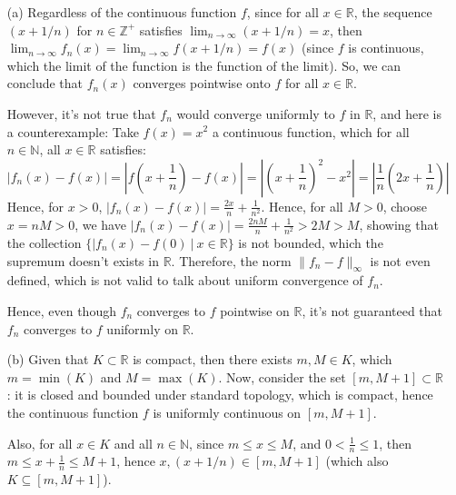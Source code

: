 \documentclass{article}
\begin{document}
\begin{itemize}
    \item[(a)] Regardless of the continuous function $f$,
    since for all $x\in\mathbb{R}$, the sequence $(x+1/n)$ for $n\in\mathbb{Z}^+$ satisfies $\lim_{n\rightarrow\infty}(x+1/n)=x$,
    then $\lim_{n\rightarrow\infty}f_n(x)=\lim_{n\rightarrow\infty} f(x+1/n) = f(x)$ (since $f$ is continuous, which the limit of the function is the function of the limit).
    So, we can conclude that $f_n(x)$ converges pointwise onto $f$ for all $x\in\mathbb{R}$.

    However, it's not true that $f_n$ would converge uniformly to $f$ in $\mathbb{R}$, and here is a counterexample: 
    Take $f(x)=x^2$ a continuous function, which for all $n\in\mathbb{N}$, all $x\in\mathbb{R}$ satisfies: 
    $$|f_n(x)-f(x)| = \left|f\left(x+\frac{1}{n}\right)-f(x)\right|=\left|\left(x+\frac{1}{n}\right)^2-x^2\right| = \left|\frac{1}{n}\left(2x+\frac{1}{n}\right)\right|$$
    Hence, for $x>0$, $|f_n(x)-f(x)| = \frac{2x}{n}+\frac{1}{n^2}$. Hence, for all $M>0$, choose $x=nM>0$, we have $|f_n(x)-f(x)| = \frac{2nM}{n}+\frac{1}{n^2} > 2M > M$,
    showing that the collection $\{|f_n(x)-f(0)\ |\ x\in\mathbb{R}\}$ is not bounded, which the supremum doesn't exists in $\mathbb{R}$.
    Therefore, the norm $\|f_n-f\|_\infty$ is not even defined, which is not valid to talk about uniform convergence of $f_n$.

    Hence, even though $f_n$ converges to $f$ pointwise on $\mathbb{R}$, it's not guaranteed that $f_n$ converges to $f$ uniformly on $\mathbb{R}$.
    
    \hfill

    \item[(b)] Given that $K\subset \mathbb{R}$ is compact, then there exists $m,M\in K$, which $m=\min(K)$ and $M=\max(K)$.
    Now, consider the set $[m,M+1]\subset\mathbb{R}$: it is closed and bounded under standard topology, which is compact, hence the continuous function $f$ is uniformly continuous on $[m,M+1]$.

    Also, for all $x\in K$ and all $n\in\mathbb{N}$, since $m\leq x\leq M$, and $0<\frac{1}{n}\leq 1$, then $m\leq x+\frac{1}{n}\leq M+1$,
    hence $x,(x+1/n)\in [m,M+1]$ (which also $K\subseteq [m,M+1]$).


\end{itemize}
\end{document}
